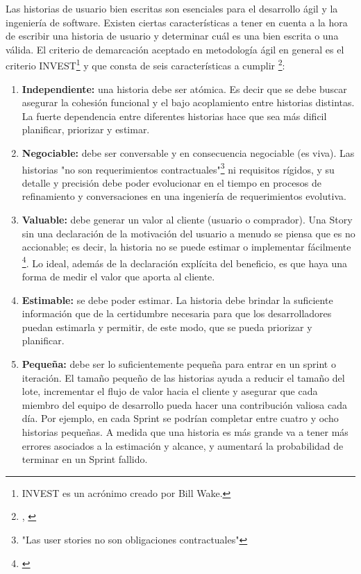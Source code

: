 Las historias de usuario bien escritas son esenciales para el desarrollo ágil y la ingeniería de software. Existen ciertas características a tener en cuenta a la hora de escribir una historia de usuario y determinar cuál es una bien escrita o una válida. El criterio de demarcación aceptado en metodología ágil en general es el criterio INVEST\footnote{INVEST es un acrónimo creado por Bill Wake.} y que consta de seis características a cumplir \footnote{\cite{UNTREF-2014}, \cite{Scrum-Alliance-2015}}:

\begin{enumerate}

\item \textbf{Independiente:} una historia debe ser atómica. Es decir que se debe buscar asegurar la cohesión funcional y el bajo acoplamiento entre historias distintas. La fuerte dependencia entre diferentes historias hace que sea más dificil planificar, priorizar y estimar.

\item \textbf{Negociable:} debe ser conversable y en consecuencia negociable (es viva). Las historias "no son requerimientos contractuales"\footnote{"Las user stories no son obligaciones contractuales"\cite{Cohn-2004}} ni requisitos rígidos, y su detalle y precisión debe poder evolucionar en el tiempo en procesos de refinamiento y conversaciones en una ingeniería de requerimientos evolutiva.

\item \textbf{Valuable:} debe generar un valor al cliente (usuario o comprador). Una Story sin una declaración de la motivación del usuario a menudo se piensa que es no accionable; es decir, la historia no se puede estimar o implementar fácilmente \footnote{\cite{Scott-Bellware-2008}}. Lo ideal, además de la declaración explícita del beneficio, es que haya una forma de medir el valor que aporta al cliente.

\item \textbf{Estimable:} se debe poder estimar. La historia debe brindar la suficiente información que de la certidumbre necesaria para que los desarrolladores puedan estimarla y permitir, de este modo, que se pueda priorizar y planificar. 

\item \textbf{Pequeña:} debe ser lo suficientemente pequeña para entrar en un sprint o iteración. El tamaño pequeño de las historias ayuda a reducir el tamaño del lote, incrementar el flujo de valor hacia el cliente y asegurar que cada miembro del equipo de desarrollo pueda hacer una contribución valiosa cada día. Por ejemplo, en cada Sprint se podrían completar entre cuatro y ocho historias pequeñas. A medida que una historia es más grande va a tener más errores asociados a la estimación y alcance, y aumentará la probabilidad de terminar en un Sprint fallido.


\end{enumerate}
